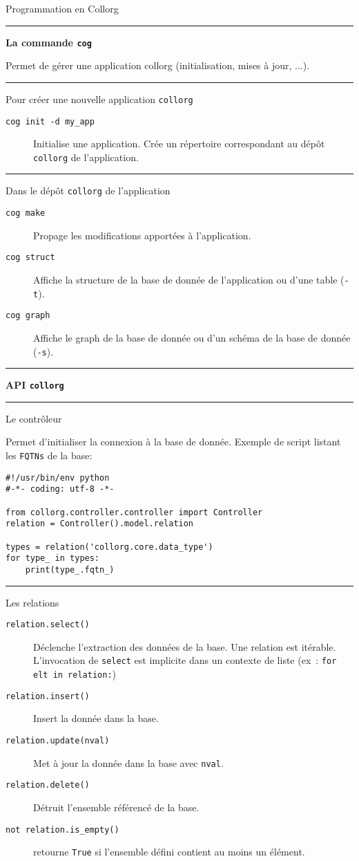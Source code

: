 \documentclass[9pt,a4paper]{letter}
\begin{document}
\begin{multicols}{3}
\begin{center}
{\Large Programmation en Collorg}
\end{center}
\rule{0.5cm}{0.1pt} \textbf{\large La commande \texttt{cog}} \hrulefill

Permet de gérer une application collorg (initialisation, mises à jour, ...).

\rule{0.5cm}{0.1pt} Pour créer une nouvelle application \texttt{collorg}
\begin{description}
\item[\texttt{cog init -d my\_app}] Initialise une application. Crée un répertoire correspondant au dépôt \texttt{collorg} de l'application.
\end{description}
\rule{0.5cm}{0.1pt} Dans le dépôt \texttt{collorg} de l'application
\begin{description}
\item[\texttt{cog make}] Propage les modifications apportées à l'application.
\item[\texttt{cog struct}] Affiche la structure de la base de donnée de l'application ou d'une table (\texttt{-t}).
\item[\texttt{cog graph}] Affiche le graph de la base de donnée ou d'un schéma de la base de donnée (\texttt{-s}).
\end{description}

\rule{0.5cm}{0.1pt} \textbf{\large API \texttt{collorg}} \hrulefill

\rule{0.5cm}{0.1pt} Le contrôleur

Permet d'initialiser la connexion à la base de donnée. Exemple de script listant les \texttt{FQTNs} de la base:

\begin{scriptsize}
\begin{verbatim}
#!/usr/bin/env python
#-*- coding: utf-8 -*-

from collorg.controller.controller import Controller
relation = Controller().model.relation

types = relation('collorg.core.data_type')
for type_ in types:
	print(type_.fqtn_)
\end{verbatim}
\end{scriptsize}

\rule{0.5cm}{0.1pt} Les relations

\begin{description}
\item[\texttt{relation.select()}] Déclenche l'extraction des données de la base. Une relation est itérable. L'invocation de \texttt{select} est implicite dans un contexte de liste (ex~: \texttt{for elt in relation:})
\item[\texttt{relation.insert()}] Insert la donnée dans la base.
\item[\texttt{relation.update(nval)}] Met à jour la donnée dans la base avec \texttt{nval}.
\item[\texttt{relation.delete()}] Détruit l'ensemble référencé de la base.
\item[\texttt{not relation.is_empty()}] retourne \texttt{True} si l'ensemble défini contient au moins un élément.
\end{description}


\end{multicols}
\end{document}
